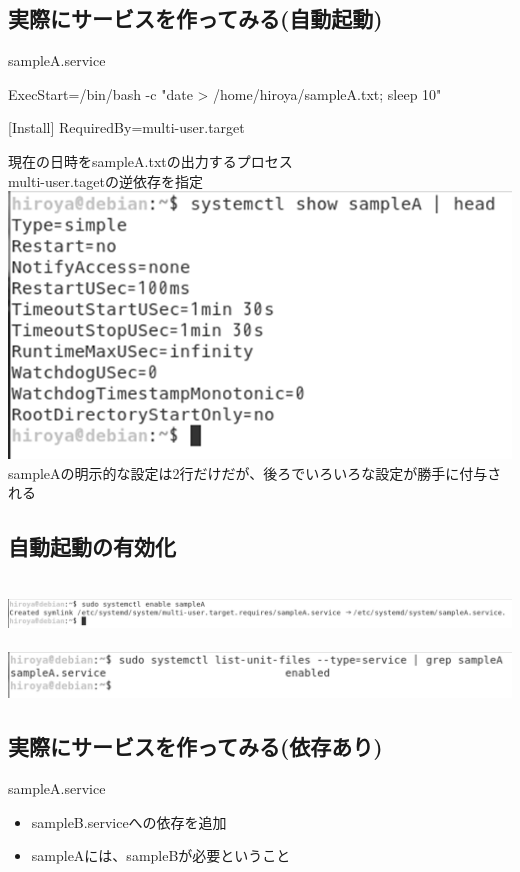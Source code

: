 \documentclass[mingoth,a4paper]{jsarticle}
\begin{document}
\subsection{実際にサービスを作ってみる(自動起動)}
sampleA.service
\begin{commandline}
[Service]
ExecStart=/bin/bash -c "date > /home/hiroya/sampleA.txt; sleep 10"

[Install]
RequiredBy=multi-user.target
\end{commandline}
現在の日時をsampleA.txtの出力するプロセス\\
multi-user.tagetの逆依存を指定
 \\
\includegraphics[keepaspectratio,width=0.5\hsize]{image201905-kansai/samplea01_gray.png}
 \\
sampleAの明示的な設定は2行だけだが、後ろでいろいろな設定が勝手に付与される

\subsection{自動起動の有効化}
　
\includegraphics[keepaspectratio,width=0.8\hsize]{image201905-kansai/samplea02_gray.png}
 \\
 \\
\includegraphics[keepaspectratio,width=0.8\hsize]{image201905-kansai/samplea03_gray.png}

\subsection{実際にサービスを作ってみる(依存あり)}
sampleA.service

\begin{itemize}
 \item sampleB.serviceへの依存を追加
 \item sampleAには、sampleBが必要ということ
\end{itemize}
\end{document}
